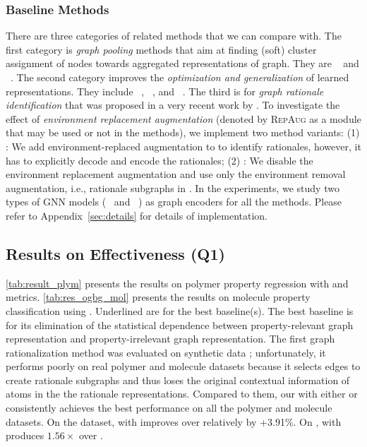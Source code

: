 \documentclass[sigconf]{acmart}
\begin{document}
\subsubsection{Baseline Methods}
There are three categories of related methods that we can compare \method with. The first category is \emph{graph pooling} methods that aim at finding (soft) cluster assignment of nodes towards aggregated representations of graph. They are \unets~\cite{gao2021graph} and \selfattn~\cite{lee2019self}.
The second category improves the \emph{optimization and generalization} of learned representations. They include \stablegnn~\cite{fan2021generalizing}, \oodgnn~\cite{li2021ood}, and \irm~\cite{arjovsky2019invariant}.
The third is \dir for \emph{graph rationale identification} that was proposed in a very recent work by \citet{wu2022discovering}.
To investigate the effect of \emph{environment replacement augmentation} (denoted by \textsc{RepAug} as a module that may be used or not in the methods), we implement two method variants: (1) \dirplusaug: We add environment-replaced augmentation to \dir \cite{wu2022discovering} to identify rationales, however, it has to explicitly decode and encode the rationales; (2) \methodnoaug: We disable the environment replacement augmentation and use only the environment removal augmentation, i.e., rationale subgraphs in \method. 
In the experiments, we study two types of GNN models (\gcn~\cite{kipf2017semi} and \gin~\cite{xu2018how}) as graph encoders for all the methods. Please refer to Appendix~\ref{sec:details} for details of implementation.

\subsection{Results on Effectiveness (Q1)}\label{sec:q1_effectivene}
\cref{tab:result_plym} presents the results on polymer property regression with \regreRSquare and \regreRMSE metrics.
\cref{tab:res_ogbg_mol} presents the results on molecule property classification using \classifyAUC.
Underlined are for the best baseline(s).
The best baseline is \oodgnn for its elimination of the statistical dependence between property-relevant graph representation and property-irrelevant graph representation. The first graph rationalization method \dir was evaluated on synthetic data \cite{wu2022discovering}; unfortunately, it performs poorly on real polymer and molecule datasets because it selects edges to create rationale subgraphs and thus loses the original contextual information of atoms in the the rationale representations. Compared to them, our \method with either \gcn or \gin consistently achieves the best performance on all the polymer and molecule datasets. On the \density dataset, \method with \gcn improves \regreRSquare over \oodgnn relatively by +3.91\%. On \meltTemp, \method with \gin produces $1.56\times$ \regreRSquare over \dir.
\end{document}
